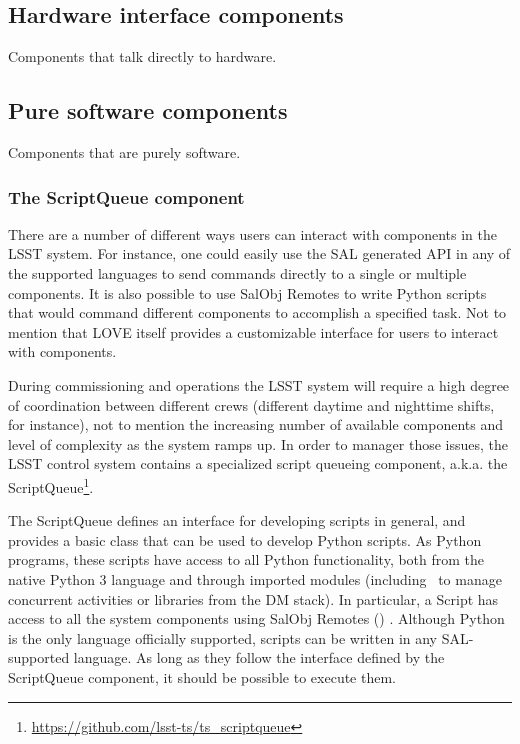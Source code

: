 \subsection{Hardware interface components}\label{sect:hardware_csc}
Components that talk directly to hardware.

\subsection{Pure software components}\label{sect:software_csc}
Components that are purely software.

\subsubsection{The ScriptQueue component} \label{sect:scriptq}
There are a number of different ways users can interact with components in the LSST system. For instance, one could easily use the SAL generated API in any of the supported languages to send commands directly to a single or multiple components. It is also possible to use SalObj Remotes to write Python scripts that would command different components to accomplish a specified task. Not to mention that LOVE itself provides a customizable interface for users to interact with components. 

During commissioning and operations the LSST system will require a high degree of coordination between different crews (different daytime and nighttime shifts, for instance), not to mention the increasing number of available components and level of complexity as the system ramps up. In order to manager those issues, the LSST control system contains a specialized script queueing component, a.k.a. the ScriptQueue\footnote{\url{https://github.com/lsst-ts/ts_scriptqueue}}.

The ScriptQueue defines an interface for developing scripts in general, and provides a basic class that can be used to develop Python scripts. As Python programs, these scripts have access to all Python functionality, both from the native Python 3 language and through imported modules (including \asyncio~to manage concurrent activities or libraries from the DM stack). In particular, a Script has access to all the system components using SalObj Remotes () . Although Python is the only language officially supported, scripts can be written in any SAL-supported language. As long as they follow the interface defined by the ScriptQueue component, it should be possible to execute them. 

